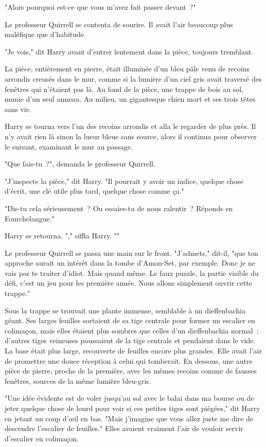 "Alors pourquoi est-ce que vous m'avez fait passer devant~?"

Le professeur Quirrell se contenta de sourire. Il avait l'air beaucoup plus maléfique que d'habitude.

"Je vois," dit Harry avant d'entrer lentement dans la pièce, toujours tremblant.

La pièce, entièrement en pierre, était illuminée d'un bleu pâle venu de recoins arrondis creusés dans le mur, comme si la lumière d'un ciel gris avait traversé des fenêtres qui n'étaient pas là. Au fond de la pièce, une trappe de bois au sol, munie d'un seul anneau. Au milieu, un gigantesque chien mort et ses trois têtes sans vie.

Harry se tourna vers l'un des recoins arrondis et alla le regarder de plus près. Il n'y avait rien là sinon la lueur bleue sans source, alors il continua pour observer le suivant, examinant le mur au passage.

"Que fais-tu~?", demanda le professeur Quirrell.

"J'inspecte la pièce," dit Harry. "Il pourrait y avoir un indice, quelque chose d'écrit, une clé utile plus tard, quelque chose comme ça."

"Dis-tu cela sérieusement~? Ou essaies-tu de nous ralentir~? Réponds en Fourchelangue."

Harry se retourna. "," siffla Harry. ""

Le professeur Quirrell se passa une main sur le front. "J'admets," dit-il, "que ton approche aurait un intérêt dans la tombe d'Amon-Set, par exemple. Donc je ne vais pas te traiter d'idiot. Mais quand même. Le faux puzzle, la partie visible du défi, c'est un jeu pour les première année. Nous allons simplement ouvrir cette trappe."

Sous la trappe se trouvait une plante immense, semblable à un dieffenbachia géant. Ses larges feuilles sortaient de sa tige centrale pour former un escalier en colimaçon, mais elles étaient plus sombres que celles d'un dieffenbachia normal~; d'autres tiges veineuses poussaient de la tige centrale et pendaient dans le vide. La base était plus large, recouverte de feuilles encore plus grandes. Elle avait l'air de promettre une douce réception à celui qui tomberait. En dessous, une autre pièce de pierre, proche de la première, avec les mêmes recoins comme de fausses fenêtres, sources de la même lumière bleu-gris.

"Une idée évidente est de voler jusqu'au sol avec le balai dans ma bourse ou de jeter quelque chose de lourd pour voir si ces petites tiges sont piégées," dit Harry en jetant un coup d'œil en bas. "Mais j'imagine que vous allez juste me dire de descendre l'escalier de feuilles." Elles avaient vraiment l'air de vouloir servir d'escalier en colimaçon.


